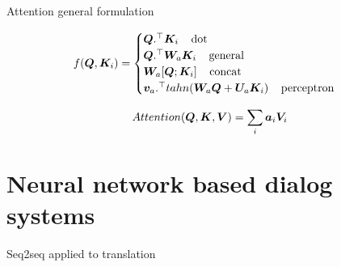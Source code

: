 \documentclass[10pt]{beamer}
\begin{document}
\begin{frame}{Attention general formulation}

\begin{equation}
f(\bm{Q},\bm{K}_i) = \begin{cases}
\bm{Q} .^{\top} \bm{K}_i\;\;\;\; \text{dot}\\
\bm{Q} .^{\top}\bm{W}_{a} \bm{K}_i\;\;\;\; \text{general}\\
\bm{W}_{a}[\bm{Q};\bm{K}_i] \;\;\;\; \text{concat}\\
\bm{v}_{a}.^{\top} tahn(\bm{W}_{a}\bm{Q} + \bm{U}_{a}\bm{K}_i)\;\;\;\; \text{perceptron}\\
\end{cases}
\end{equation}

\begin{figure}[ht!]
\centering
{}
\end{figure}

\begin{equation}
Attention(\bm{Q},\bm{K}, \bm{V})= \sum_{i} \bm{a}_{i}\bm{V}_i
\end{equation}


\end{frame}







\section{Neural network based dialog systems}

\begin{frame}{Seq2seq applied to translation}

\end{frame}
\end{document}
